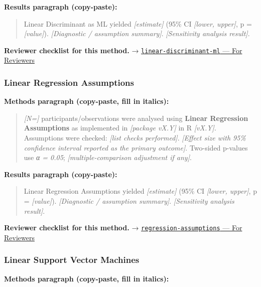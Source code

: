 \documentclass[
]{article}
\begin{document}
\textbf{Results paragraph (copy-paste):}

\begin{quote}
Linear Discriminant as ML yielded \emph{{[}estimate{]}} (95\% CI
\emph{{[}lower, upper{]}}, p = \emph{{[}value{]}}). \emph{{[}Diagnostic
/ assumption summary{]}}. \emph{{[}Sensitivity analysis result{]}}.
\end{quote}

\textbf{Reviewer checklist for this method.} →
\href{../chapters/13-ml/linear-discriminant-ml.Rmd\#for-reviewers}{\texttt{linear-discriminant-ml}
--- For Reviewers}

\subsubsection{Linear Regression
Assumptions}\label{linear-regression-assumptions}

\textbf{Methods paragraph (copy-paste, fill in italics):}

\begin{quote}
\emph{{[}N={]}} participants/observations were analysed using
\textbf{Linear Regression Assumptions} as implemented in
\emph{{[}package vX.Y{]}} in R \emph{{[}vX.Y{]}}. Assumptions were
checked: \emph{{[}list checks performed{]}}. \emph{{[}Effect size with
95\% confidence interval reported as the primary outcome{]}}. Two-sided
p-values use \emph{α = 0.05}; \emph{{[}multiple-comparison adjustment if
any{]}}.
\end{quote}

\textbf{Results paragraph (copy-paste):}

\begin{quote}
Linear Regression Assumptions yielded \emph{{[}estimate{]}} (95\% CI
\emph{{[}lower, upper{]}}, p = \emph{{[}value{]}}). \emph{{[}Diagnostic
/ assumption summary{]}}. \emph{{[}Sensitivity analysis result{]}}.
\end{quote}

\textbf{Reviewer checklist for this method.} →
\href{../chapters/07-regression/regression-assumptions.Rmd\#for-reviewers}{\texttt{regression-assumptions}
--- For Reviewers}

\subsubsection{Linear Support Vector
Machines}\label{linear-support-vector-machines}

\textbf{Methods paragraph (copy-paste, fill in italics):}
\end{document}
